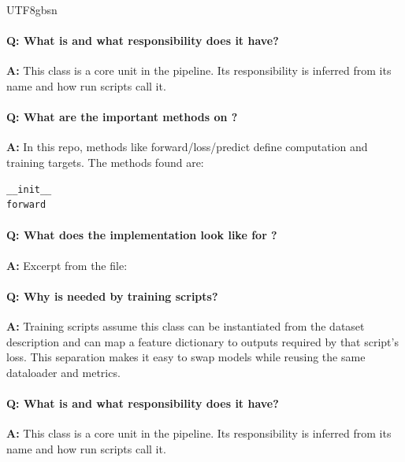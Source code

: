 \documentclass[11pt]{article}
\begin{document}
\begin{CJK*}{UTF8}{gbsn}
\vspace{1mm}


\paragraph{Q: What is \texttt{} and what responsibility does it have?}
\textbf{A:} This class is a core unit in the pipeline. Its responsibility is inferred from its name and how run scripts call it.

\paragraph{Q: What are the important methods on \texttt{}?}
\textbf{A:} In this repo, methods like forward/loss/predict define computation and training targets. The methods found are:

\begin{Verbatim}[fontsize=\small]
__init__
forward
\end{Verbatim}

\paragraph{Q: What does the implementation look like for \texttt{}?}
\textbf{A:} Excerpt from the file:

\vspace{1mm}


\paragraph{Q: Why is \texttt{} needed by training scripts?}
\textbf{A:} Training scripts assume this class can be instantiated from the dataset description and can map a feature dictionary to outputs required by that script's loss. This separation makes it easy to swap models while reusing the same dataloader and metrics.

\paragraph{Q: What is \texttt{} and what responsibility does it have?}
\textbf{A:} This class is a core unit in the pipeline. Its responsibility is inferred from its name and how run scripts call it.


\end{CJK*}
\end{document}
